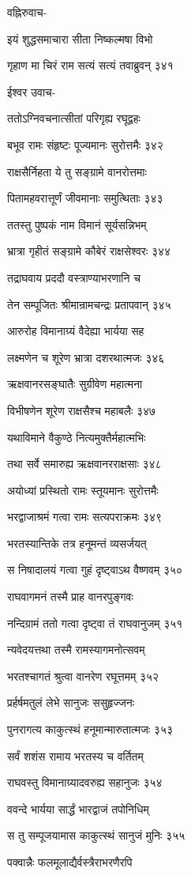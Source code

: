 वह्निरुवाच-

इयं शुद्धसमाचारा सीता निष्कल्मषा विभो

गृहाण मा चिरं राम सत्यं सत्यं तवाब्रुवन् ३४१

ईश्वर उवाच-

ततोऽग्निवचनात्सीतां परिगृह्य रघूद्वहः

बभूव रामः संहृष्टः पूज्यमानः सुरोत्तमैः ३४२

राक्षसैर्निहता ये तु सङ्ग्रामे वानरोत्तमाः

पितामहवरात्तूर्णं जीवमानाः समुत्थिताः ३४३

ततस्तु पुष्पकं नाम विमानं सूर्यसन्निभम्

भ्रात्रा गृहीतं सङ्ग्रामे कौबेरं राक्षसेश्वरः ३४४

तद्राघवाय प्रददौ वस्त्राण्याभरणानि च

तेन सम्पूजितः श्रीमान्रामचन्द्रः प्रतापवान् ३४५

आरुरोह विमानाग्र्यं वैदेह्या भार्यया सह

लक्ष्मणेन च शूरेण भ्रात्रा दशरथात्मजः ३४६

ऋक्षवानरसङ्घातैः सुग्रीवेण महात्मना

विभीषणेन शूरेण राक्षसैश्च महाबलैः ३४७

यथाविमाने वैकुण्ठे नित्यमुक्तैर्महात्मभिः

तथा सर्वे समारुह्य ऋक्षवानरराक्षसाः ३४८

अयोध्यां प्रस्थितो रामः स्तूयमानः सुरोत्तमैः

भरद्वाजाश्रमं गत्वा रामः सत्यपराक्रमः ३४९

भरतस्यान्तिके तत्र हनूमन्तं व्यसर्जयत्

स निषादालयं गत्वा गुहं दृष्ट्वाऽथ वैष्णवम् ३५०

राघवागमनं तस्मै प्राह वानरपुङ्गवः

नन्दिग्रामं ततो गत्वा दृष्ट्वा तं राघवानुजम् ३५१

न्यवेदयत्तथा तस्मै रामस्यागमनोत्सवम्

भरतश्चागतं श्रुत्वा वानरेण रघूत्तमम् ३५२

प्रर्हर्षमतुलं लेभे सानुजः ससुहृज्जनः

पुनरागत्य काकुत्स्थं हनूमान्मारुतात्मजः ३५३

सर्वं शशंस रामाय भरतस्य च वर्तितम्

राघवस्तु विमानाग्र्यादवरुह्य सहानुजः ३५४

ववन्दे भार्यया सार्द्धं भारद्वाजं तपोनिधिम्

स तु सम्पूजयामास काकुत्स्थं सानुजं मुनिः ३५५

पक्वान्नैः फलमूलाद्यैर्वस्त्रैराभरणैरपि

